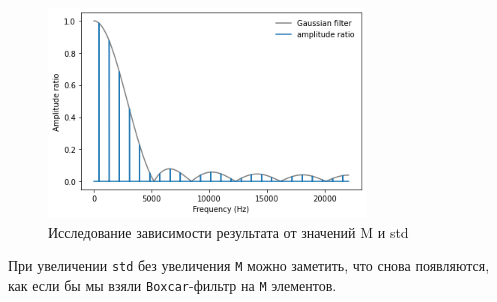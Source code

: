 \documentclass[a4paper, 12pt]{report}
\begin{document}
	\begin{figure}[H]
		\centering
		\includegraphics[width=0.75\textwidth]{test11.png}
		\caption{Исследование зависимости результата от значений M и std}
		\label{fig:test11}
	\end{figure}
	При увеличении \texttt{std} без увеличения \texttt{M} можно заметить, что  снова появляются, как если бы мы взяли \texttt{Boxcar}-фильтр на \texttt{M} элементов.
\end{document}
